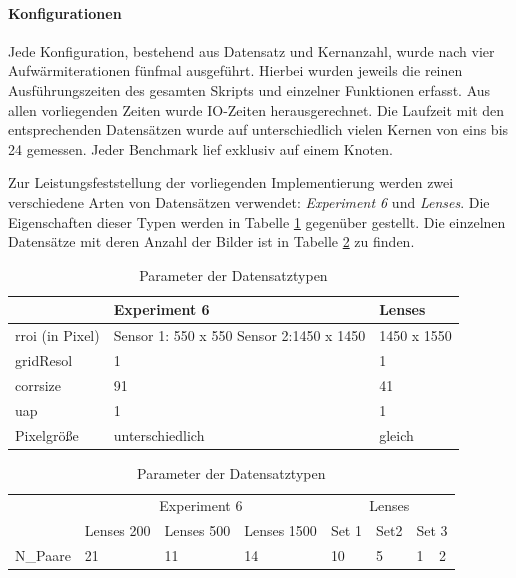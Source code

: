 \paragraph{Konfigurationen}

Jede Konfiguration, bestehend aus Datensatz und Kernanzahl, wurde nach vier Aufwärmiterationen fünfmal ausgeführt. Hierbei wurden jeweils die reinen Ausführungszeiten des gesamten Skripts und einzelner Funktionen erfasst. Aus allen vorliegenden Zeiten wurde \gls{IO}-Zeiten herausgerechnet. Die Laufzeit mit den entsprechenden Datensätzen wurde auf unterschiedlich vielen Kernen von eins bis 24 gemessen. Jeder Benchmark lief exklusiv auf einem Knoten. 

Zur Leistungsfeststellung der vorliegenden Implementierung werden zwei verschiedene Arten von Datensätzen verwendet: \textit{Experiment 6} und \textit{Lenses}. Die Eigenschaften dieser Typen werden in Tabelle \ref{tab:dataset_types} gegenüber gestellt. Die einzelnen Datensätze mit deren Anzahl der Bilder ist in Tabelle \ref{tab:datasets} zu finden. 

\begin{table}
	\begin{tabularx}{\textwidth}{@{} XXX @{}}
		\toprule
		& Experiment 6 & Lenses \\
		\hline
		\gls{rroi} (in Pixel) & Sensor 1: 550 x 550 \newline
		Sensor 2:1450 x 1450  & 1450 x 1550 \\
		\gls{gridResol} & 1 & 1 \\
		\gls{corrsize} & 91 & 41 \\
		\gls{uap} & 1 & 1 \\
		Pixelgröße & unterschiedlich & gleich \\
		\bottomrule
	\end{tabularx}
	\caption{Parameter der Datensatztypen}
	\label{tab:dataset_types}
\end{table}

\begin{table}
	\begin{tabularx}{\textwidth}{@{} XXXXXXXX @{}}
		\toprule
		& \multicolumn{3}{c}{Experiment 6} & \multicolumn{4}{c}{Lenses} \\
		\cmidrule(lr){2-4}
		\cmidrule(lr){5-8}
		& Lenses 200 & Lenses 500 & Lenses 1500 & Set 1 & Set2 & \multicolumn{2}{X}{Set 3} \\
		\hline
		\gls{N_Paare} & 21 & 11 & 14 & 10 & 5 & 1 & 2 \\
		\bottomrule
	\end{tabularx}
	\caption{Parameter der Datensatztypen}
	\label{tab:datasets}
\end{table}

